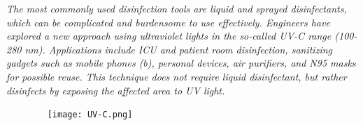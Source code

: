 \documentclass[12pt]{article}
\begin{document}
\hspace{1cm}\large{\emph{The most commonly used disinfection tools are liquid and sprayed disinfectants, which can be complicated and burdensome to use effectively. Engineers have explored a new approach using ultraviolet lights in the so-called UV-C range (100-280 nm).  Applications include ICU and patient room disinfection, sanitizing gadgets such as mobile phones (b), personal devices,  air purifiers, and N95 masks for possible reuse. This technique does not require liquid disinfectant, but rather disinfects by exposing the affected area to UV light.}}

\begin{figure}
    \centering
    \texttt{[image: UV-C.png]}
\end{figure}
\vspace{1cm}
\end{document}
